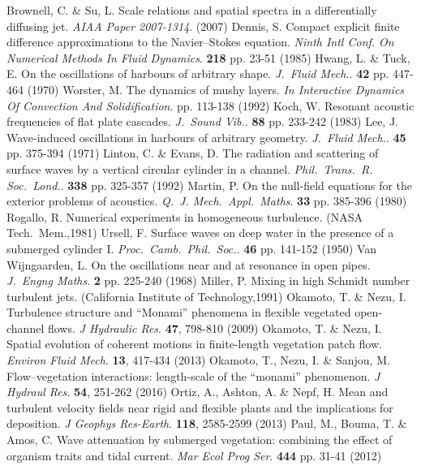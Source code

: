 \documentclass[lineno,authoryear]{FLO_v1}%
\theoremstyle{definition}
\begin{document}
\begin{Backmatter}
\begin{thebibliography}{}
Brownell, C. \& Su, L. Scale relations and spatial spectra in a differentially diffusing jet. {\em AIAA Paper 2007-1314}. (2007)
Dennis, S. Compact explicit finite difference approximations to the Navier–Stokes equation. {\em Ninth Intl Conf. On Numerical Methods In Fluid Dynamics}. \textbf{218} pp. 23-51 (1985)
Hwang, L. \& Tuck, E. On the oscillations of harbours of arbitrary shape. {\em J. Fluid Mech.}. \textbf{42} pp. 447-464 (1970)
Worster, M. The dynamics of mushy layers. {\em In Interactive Dynamics Of Convection And Solidification}. pp. 113-138 (1992)
Koch, W. Resonant acoustic frequencies of flat plate cascades. {\em J. Sound Vib.}. \textbf{88} pp. 233-242 (1983)
Lee, J. Wave-induced oscillations in harbours of arbitrary geometry. {\em J. Fluid Mech.}. \textbf{45} pp. 375-394 (1971)
Linton, C. \& Evans, D. The radiation and scattering of surface waves by a vertical circular cylinder in a channel. {\em Phil.\ Trans.\ R. Soc.\ Lond.}. \textbf{338} pp. 325-357 (1992)
Martin, P. On the null-field equations for the exterior problems of acoustics. {\em Q. J. Mech.\ Appl.\ Maths}. \textbf{33} pp. 385-396 (1980)
Rogallo, R. Numerical experiments in homogeneous turbulence. (NASA Tech.\ Mem.,1981)
Ursell, F. Surface waves on deep water in the presence of a submerged cylinder I. {\em Proc.\ Camb.\ Phil.\ Soc.}. \textbf{46} pp. 141-152 (1950)
Van Wijngaarden, L. On the oscillations near and at resonance in open pipes. {\em J. Engng Maths}. \textbf{2} pp. 225-240 (1968)
Miller, P. Mixing in high Schmidt number turbulent jets. (California Institute of Technology,1991)
Okamoto, T. \& Nezu, I. Turbulence structure and “Monami” phenomena in flexible vegetated open-channel flows. {\em J Hydraulic Res}. \textbf{47}, 798-810 (2009)
Okamoto, T. \& Nezu, I. Spatial evolution of coherent motions in finite-length vegetation patch flow. {\em Environ Fluid Mech}. \textbf{13}, 417-434 (2013)
Okamoto, T., Nezu, I. \& Sanjou, M. Flow–vegetation interactions: length-scale of the “monami” phenomenon. {\em J Hydraul Res}. \textbf{54}, 251-262 (2016)
Ortiz, A., Ashton, A. \& Nepf, H. Mean and turbulent velocity fields near rigid and flexible plants and the implications for deposition. {\em J Geophys Res-Earth}. \textbf{118}, 2585-2599 (2013)
Paul, M., Bouma, T. \& Amos, C. Wave attenuation by submerged vegetation: combining the effect of organism traits and tidal current. {\em Mar Ecol Prog Ser}. \textbf{444} pp. 31-41 (2012)

\end{thebibliography}
\end{Backmatter}
\end{document}
